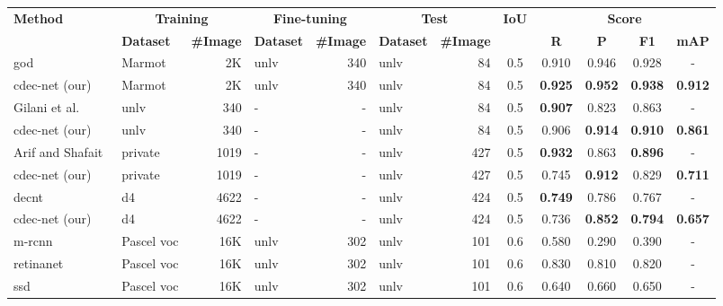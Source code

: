 \documentclass[a4paper,conference]{IEEEtran}
\begin{document}
\begin{table*}
\begin{center}
\begin{tabular}{|l| l | r|l |r|l|r| c| c c c c|} \hline
\textbf{Method} &\multicolumn{2}{|c|}{\textbf{Training}} &\multicolumn{2}{|c|}{\textbf{Fine-tuning}} &\multicolumn{2}{|c|}{\textbf{Test}} &\textbf{IoU} & \multicolumn{4}{|c|}{\textbf{Score}} \\ \cline{2-7} \cline{9-12}
  &\textbf{Dataset} &\textbf{\#Image} &\textbf{Dataset} &\textbf{\#Image} &\textbf{Dataset} &\textbf{\#Image} &  &\textbf{R} &\textbf{P} &\textbf{F1} &\textbf{mAP} \\ 
  \hline  
{\sc god}~\cite{saha2019graphical} &Marmot &2K &{\sc unlv} &340 &{\sc unlv} &84 &0.5 &0.910 &0.946 &0.928 &- \\ 
{\sc cd}e{\sc c-n}et (our) &Marmot &2K &{\sc unlv} &340 &{\sc unlv} &84 &0.5 &\textbf{0.925} &\textbf{0.952} &\textbf{0.938} & \textbf{0.912} \\ \hhline{|=|=|=|=|=|=|=|=|====|}
Gilani et al.~\cite{gilani2017table} &{\sc unlv} &340 &- &- &{\sc unlv} &84 &0.5 &\textbf{0.907} &0.823 &0.863 &- \\
{\sc cd}e{\sc c-n}et (our) &{\sc unlv} &340 &- &- &{\sc unlv} &84 &0.5 &0.906 &\textbf{0.914} &\textbf{0.910} &\textbf{0.861} \\ \hhline{|=|=|=|=|=|=|=|=|====|}
Arif and Shafait~\cite{arif2018table} &private &1019 &- &- &{\sc unlv} &427 &0.5 &\textbf{0.932} &0.863 &\textbf{0.896} &- \\ 
{\sc cd}e{\sc c-n}et (our) &private &1019 &- &- &{\sc unlv} &427 &0.5 &0.745 &\textbf{0.912} &0.829 &\textbf{0.711}  \\ \hhline{|=|=|=|=|=|=|=|=|====|}
{\sc d}e{\sc cnt}~\cite{siddiqui2018decnt} &{\sc d4} &4622 &- &- &{\sc unlv} &424 &0.5 &\textbf{0.749} &0.786 &0.767 &- \\ 
{\sc cd}e{\sc c-n}et (our) &{\sc d4} &4622 &- &- &{\sc unlv} &424 &0.5 &0.736 &\textbf{0.852} &\textbf{0.794} &\textbf{0.657} \\ \hhline{|=|=|=|=|=|=|=|=|====|}
{\sc m-rcnn}~\cite{casado2019benefits} &Pascel {\sc voc} &16K &{\sc unlv} &302 &{\sc unlv} &101 &0.6 &0.580 &0.290 &0.390 &- \\
{\sc r}etina{\sc n}et~\cite{casado2019benefits} &Pascel {\sc voc} &16K &{\sc unlv} &302 &{\sc unlv} &101 &0.6 &0.830 &0.810 &0.820 &- \\
{\sc ssd}~\cite{casado2019benefits} &Pascel {\sc voc} &16K &{\sc unlv} &302 &{\sc unlv} &101 &0.6 &0.640 &0.660 &0.650 &- \\

\end{tabular}
\end{center}
\end{table*}
\end{document}
